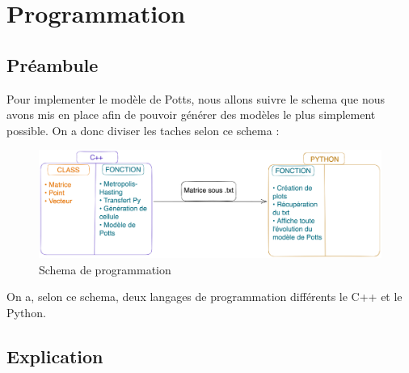 

\chapter{Programmation}
\setcounter{chapter}{1}

\begin{article}
    \section{Préambule}\label{sec:preambule}%
    Pour implementer le modèle de Potts, nous allons suivre le schema que nous avons mis en place afin de pouvoir générer des modèles le plus simplement possible.
    \newline On a donc diviser les taches selon ce schema :
    \newline
    \begin{figure}[ht]
        \centering
        \includegraphics[scale=0.09]{./img/prog/Schema_prog}
        \caption{Schema de programmation}
        \label{fig:prog1}
    \end{figure}

    On a, selon ce schema, deux langages de programmation différents le C++ et le Python.

    \section{Explication}\label{sec:explication}

\end{article}

